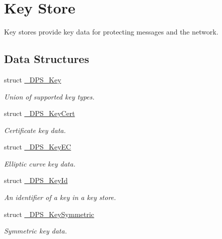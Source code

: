 \hypertarget{group__keystore}{}\section{Key Store}
\label{group__keystore}


Key stores provide key data for protecting messages and the network.  


\subsection*{Data Structures}
\begin{DoxyCompactItemize}
\item 
struct \hyperlink{struct___d_p_s___key}{\+\_\+\+D\+P\+S\+\_\+\+Key}
\begin{DoxyCompactList}\small\item\em Union of supported key types. \end{DoxyCompactList}\item 
struct \hyperlink{struct___d_p_s___key_cert}{\+\_\+\+D\+P\+S\+\_\+\+Key\+Cert}
\begin{DoxyCompactList}\small\item\em Certificate key data. \end{DoxyCompactList}\item 
struct \hyperlink{struct___d_p_s___key_e_c}{\+\_\+\+D\+P\+S\+\_\+\+Key\+EC}
\begin{DoxyCompactList}\small\item\em Elliptic curve key data. \end{DoxyCompactList}\item 
struct \hyperlink{struct___d_p_s___key_id}{\+\_\+\+D\+P\+S\+\_\+\+Key\+Id}
\begin{DoxyCompactList}\small\item\em An identifier of a key in a key store. \end{DoxyCompactList}\item 
struct \hyperlink{struct___d_p_s___key_symmetric}{\+\_\+\+D\+P\+S\+\_\+\+Key\+Symmetric}
\begin{DoxyCompactList}\small\item\em Symmetric key data. \end{DoxyCompactList}\end{DoxyCompactItemize}
